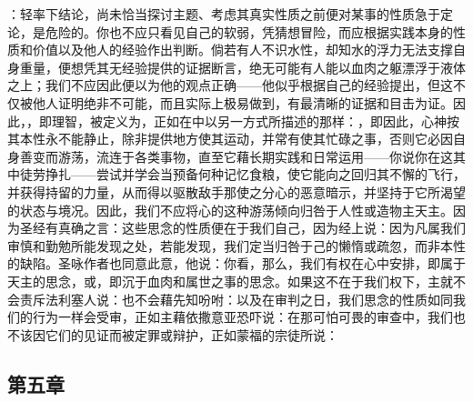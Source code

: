 ：轻率下结论，尚未恰当探讨主题、考虑其真实性质之前便对某事的性质急于定论，是危险的。你也不应只看见自己的软弱，凭猜想冒险，而应根据实践本身的性质和价值以及他人的经验作出判断。倘若有人不识水性，却知水的浮力无法支撑自身重量，便想凭其无经验提供的证据断言，绝无可能有人能以血肉之躯漂浮于液体之上；我们不应因此便以为他的观点正确——他似乎根据自己的经验提出，但这不仅被他人证明绝非不可能，而且实际上极易做到，有最清晰的证据和目击为证。因此，，即理智，被定义为，正如在中以另一方式所描述的那样：，即因此，心神按其本性永不能静止，除非提供地方使其运动，并常有使其忙碌之事，否则它必因自身善变而游荡，流连于各类事物，直至它藉长期实践和日常运用——你说你在这其中徒劳挣扎——尝试并学会当预备何种记忆食粮，使它能向之回归其不懈的飞行，并获得持留的力量，从而得以驱散敌手那使之分心的恶意暗示，并坚持于它所渴望的状态与境况。因此，我们不应将心的这种游荡倾向归咎于人性或造物主天主。因为圣经有真确之言：这些思念的性质便在于我们自己，因为经上说：因为凡属我们审慎和勤勉所能发现之处，若能发现，我们定当归咎于己的懒惰或疏忽，而非本性的缺陷。圣咏作者也同意此意，他说：你看，那么，我们有权在心中安排，即属于天主的思念，或，即沉于血肉和属世之事的思念。如果这不在于我们权下，主就不会责斥法利塞人说：也不会藉先知吩咐：以及在审判之日，我们思念的性质如同我们的行为一样会受审，正如主藉依撒意亚恐吓说：在那可怕可畏的审查中，我们也不该因它们的见证而被定罪或辩护，正如蒙福的宗徒所说：\par


\subsection{第五章}

